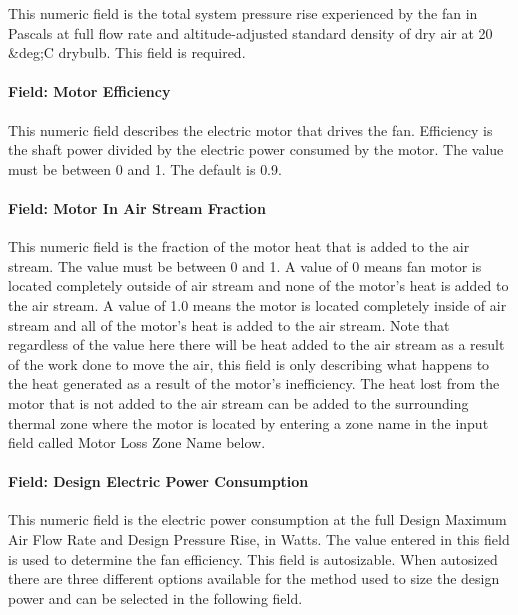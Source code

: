 This numeric field is the total system pressure rise experienced by the fan in Pascals at full flow rate and altitude-adjusted standard density of dry air at 20 &deg;C drybulb. This field is required. 

\paragraph{Field: Motor Efficiency}\label{field-motor-eff-fansysmodel}

This numeric field describes the electric motor that drives the fan.  Efficiency is the shaft power divided by the electric power consumed by the motor.  The value must be between 0 and 1. The default is 0.9.

\paragraph{Field: Motor In Air Stream Fraction}\label{field-motor-in-air-stream-fansysmodel}

This numeric field is the fraction of the motor heat that is added to the air stream.  The value must be between 0 and 1.  A value of 0 means fan motor is located completely outside of air stream and none of the motor's heat is added to the air stream.  A value of 1.0 means the motor is located completely inside of air stream and all of the motor's heat is added to the air stream.  Note that regardless of the value here there will be heat added to the air stream as a result of the work done to move the air, this field is only describing what happens to the heat generated as a result of the motor's inefficiency. The heat lost from the motor that is not added to the air stream can be added to the surrounding thermal zone where the motor is located by entering a zone name in the input field called Motor Loss Zone Name below. 

\paragraph{Field: Design Electric Power Consumption}\label{field-design-elec-power-fansysmodel}

This numeric field is the electric power consumption at the full Design Maximum Air Flow Rate and Design Pressure Rise, in Watts.  The value entered in this field is used to determine the fan efficiency. This field is autosizable.  When autosized there are three different options available for the method used to size the design power and can be selected in the following field.        

